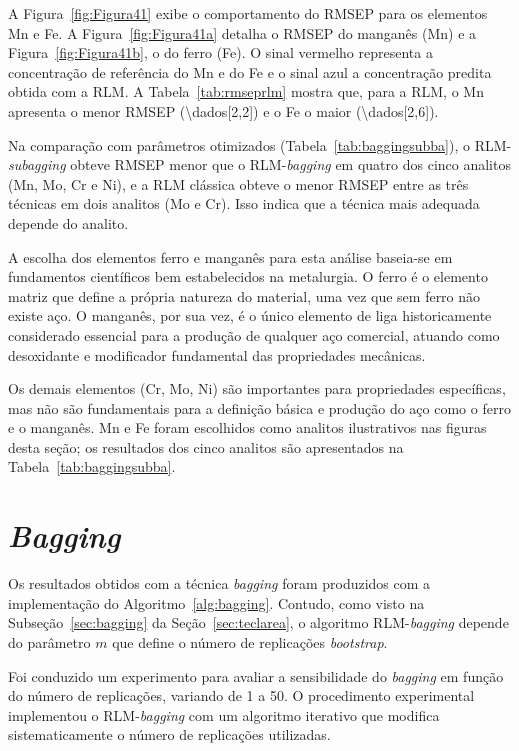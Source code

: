 A Figura~\ref{fig:Figura41} exibe o comportamento do RMSEP para os elementos
Mn e Fe. A Figura~\ref{fig:Figura41a} detalha o RMSEP do manganês (Mn) e a
Figura~\ref{fig:Figura41b}, o do ferro (Fe). O sinal vermelho representa a
concentração de referência do Mn e do Fe e o sinal azul a concentração predita
obtida com a RLM. A Tabela~\ref{tab:rmseprlm} mostra que, para a RLM, o Mn
apresenta o menor RMSEP (\num{\dados[2,2]}) e o Fe o maior (\num{\dados[2,6]}).

Na comparação com parâmetros otimizados (Tabela~\ref{tab:baggingsubba}), o
RLM-\textit{subagging} obteve RMSEP menor que o RLM-\textit{bagging} em quatro
dos cinco analitos (Mn, Mo, Cr e Ni), e a RLM clássica obteve o menor RMSEP
entre as três técnicas em dois analitos (Mo e Cr). Isso indica que a técnica
mais adequada depende do analito.

A escolha dos elementos ferro e manganês para esta análise baseia-se em
fundamentos científicos bem estabelecidos na metalurgia. O ferro é o elemento
matriz que define a própria natureza do material, uma vez que sem ferro não
existe aço. O manganês, por sua vez, é o único elemento de liga historicamente
considerado essencial para a produção de qualquer aço comercial, atuando como
desoxidante e modificador fundamental das propriedades mecânicas.

Os demais elementos (Cr, Mo, Ni) são importantes para propriedades
específicas, mas não são fundamentais para a definição básica e produção do aço
como o ferro e o manganês. Mn e Fe foram escolhidos como analitos ilustrativos
nas figuras desta seção; os resultados dos cinco analitos são apresentados na
Tabela~\ref{tab:baggingsubba}.


\section{\textit{Bagging}}
\label{sec:bagging2}
Os resultados obtidos com a técnica \textit{bagging} foram produzidos com a implementação do Algoritmo~\ref{alg:bagging}. Contudo, como visto na Subseção~\ref{sec:bagging} da Seção~\ref{sec:teclarea}, o algoritmo RLM-\textit{bagging} depende do parâmetro $m$ que define o número de replicações \textit{bootstrap}.

Foi conduzido um experimento para avaliar a sensibilidade do \textit{bagging} em função do número de replicações, variando de 1 a 50. O procedimento experimental implementou o RLM-\textit{bagging} com um algoritmo iterativo que modifica sistematicamente o número de replicações utilizadas.

